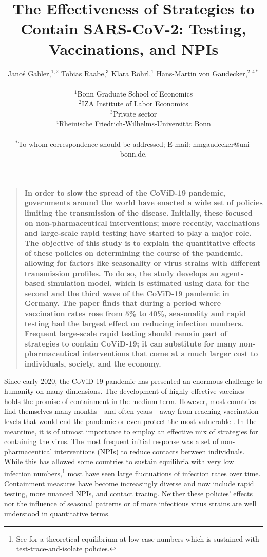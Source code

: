 \documentclass[12pt]{article}
\title{The Effectiveness of Strategies to Contain SARS-CoV-2: Testing, Vaccinations, and NPIs}
\author
{Janoś Gabler,$^{1, 2}$ Tobias Raabe,$^{3}$ Klara Röhrl,$^{1}$ Hans-Martin von Gaudecker,$^{2,4\ast}$\\
\\
\normalsize{$^{1}$Bonn Graduate School of Economics}\\
\normalsize{$^{2}$IZA Institute of Labor Economics}\\
\normalsize{$^{3}$Private sector}\\
\normalsize{$^{4}$Rheinische Friedrich-Wilhelms-Universität Bonn}\\
\\
\normalsize{$^\ast$To whom correspondence should be addressed; E-mail:  hmgaudecker@uni-bonn.de.}
}
\date{}
\newenvironment{sciabstract}{%
\begin{quote} \bf}
{\end{quote}}
\begin{document}

\baselineskip24pt


\maketitle




\begin{sciabstract}
    In order to slow the spread of the CoViD-19 pandemic, governments around the world
    have enacted a wide set of policies limiting the transmission of the disease.
    Initially, these focused on non-pharmaceutical interventions; more recently,
    vaccinations and large-scale rapid testing have started to play a major role. The
    objective of this study is to explain the quantitative effects of these policies on
    determining the course of the pandemic, allowing for factors like seasonality or
    virus strains with different transmission profiles. To do so, the study develops an
    agent-based simulation model, which is estimated using data for the second and the
    third wave of the CoViD-19 pandemic in Germany. The paper finds that during a period
    where vaccination rates rose from 5\% to 40\%, seasonality and rapid testing had the
    largest effect on reducing infection numbers. Frequent large-scale rapid testing
    should remain part of strategies to contain CoViD-19; it can substitute for many
    non-pharmaceutical interventions that come at a much larger cost to individuals,
    society, and the economy.
\end{sciabstract}

Since early 2020, the CoViD-19 pandemic has presented an enormous challenge to humanity
on many dimensions. The development of highly effective vaccines holds the promise of
containment in the medium term. However, most countries find themselves many months---and
often years---away from reaching vaccination levels that would end the pandemic or even
protect the most vulnerable \cite{Mathieu2021}. In the meantime, it is of utmost
importance to employ an effective mix of strategies for containing the virus. The most
frequent initial response was a set of non-pharmaceutical interventions (NPIs) to reduce
contacts between individuals. While this has allowed some countries to sustain equilibria
with very low infection numbers,\footnote{See \cite{Contreras2021} for a theoretical
equilibrium at low case numbers which is sustained with test-trace-and-isolate
policies.} most have
seen large fluctuations of infection rates over time. Containment measures have become
increasingly diverse and now include rapid testing, more nuanced NPIs, and contact
tracing. Neither these policies' effects nor the influence of seasonal patterns or of
more infectious virus strains are well understood in quantitative terms.
\end{document}
